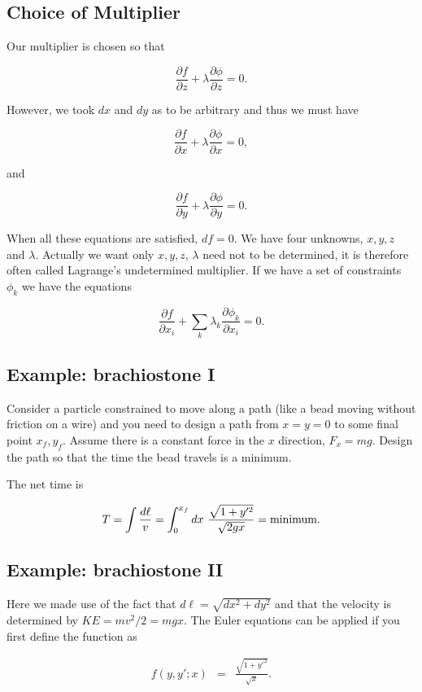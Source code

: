 \documentclass[%
oneside,                 %
final,                   %
10pt]{article}
\begin{document}
\subsection{Choice of Multiplier}

Our multiplier is chosen so that

\[
\frac{\partial f}{\partial z}+\lambda\frac{\partial \phi}{\partial z} =0.
\]

However, we took $dx$ and $dy$ as to be arbitrary and thus we must have

\[
\frac{\partial f}{\partial x}+\lambda\frac{\partial \phi}{\partial x} =0,
\]

and

\[
\frac{\partial f}{\partial y}+\lambda\frac{\partial \phi}{\partial y} =0.
\]

When all these equations are satisfied, $df=0$.  We have four
unknowns, $x,y,z$ and $\lambda$. Actually we want only $x,y,z$,
$\lambda$ need not to be determined, it is therefore often called
Lagrange's undetermined multiplier.  If we have a set of constraints
$\phi_k$ we have the equations

\[
\frac{\partial f}{\partial x_i}+\sum_k\lambda_k\frac{\partial \phi_k}{\partial x_i} =0.
\]

\subsection{Example: brachiostone I}

Consider a particle constrained to move along a path (like a bead
moving without friction on a wire) and you need to design a path from
$x=y=0$ to some final point $x_f,y_f$. Assume there is a constant
force in the $x$ direction, $F_x=mg$. Design the path so that the time
the bead travels is a minimum.

The net time is

\[
T=\int \frac{d\ell}{v}=\int_0^{x_f} dx~\frac{\sqrt{1+y'^2}}{\sqrt{2gx}}={\rm minimum}.
\]

\subsection{Example: brachiostone II}

Here we made use of the fact that $d\ell=\sqrt{dx^2+dy^2}$ and that
the velocity is determined by $KE=mv^2/2=mgx$. The Euler equations can
be applied if you first define the function as

\begin{eqnarray*}
f(y,y';x)&=&\frac{\sqrt{1+y'^2}}{\sqrt{x}}.
\end{eqnarray*}
\end{document}
